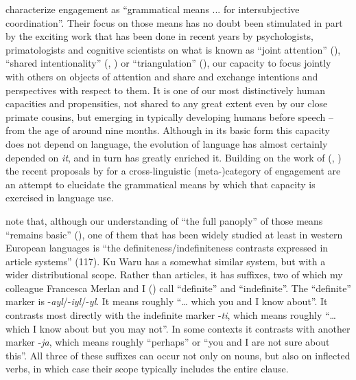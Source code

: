 \documentclass[output=paper]{langsci/langscibook}
\begin{document}
\citet[112]{Evansetal2018a} characterize engagement as “grammatical means ... for intersubjective coordination”. Their focus on those means has no doubt been stimulated in part by the exciting work that has been done in recent years by psychologists, primatologists and cognitive scientists on what is known as “joint attention” (\citealt{Elian2005}), “shared intentionality” (\citealt{Tomasello1999}, \citealt{Tomasello2005}) or “triangulation” (\citealt{Hobson2004}), our capacity to focus jointly with others on objects of attention and share and exchange intentions and perspectives with respect to them. It is one of our most distinctively human capacities and propensities, not shared to any great extent even by our close primate cousins, but emerging in typically developing humans before speech – from the age of around nine months. Although in its basic form this capacity does not depend on language, the evolution of language has almost certainly depended on \textit{it}, and in turn has greatly enriched it. Building on the work of \citeauthor{Landaburu2005} (\citeyear{Landaburu2005}, \citeyear{Landaburu2007}) the recent proposals by \citet{Evansetal2018b} for a cross-linguistic (meta-)category of engagement are an attempt to elucidate the grammatical means by which that capacity is exercised in language use. 

\citeauthor{Evansetal2018a} note that, although our understanding of “the full panoply” of those means “remains basic” (\citeyear[112]{Evansetal2018a}), one of them that has been widely studied at least in western European languages is “the definiteness/indefiniteness contrasts expressed in article systems” (117).
Ku Waru has a somewhat similar system, but with a wider distributional scope. Rather than articles, it has suffixes, two of which my colleague Francesca Merlan and I (\citealt[336--337]{MerlanRumsey1991}) call “definite” and “indefinite”.  The “definite” marker is   -\textit{ayl}/-\textit{iyl}/-\textit{yl}. It means roughly “… which you and I know about”. It contrasts most directly with the indefinite marker -\textit{ti}, which means roughly “… which I know about but you may not”. In some contexts it contrasts with another marker -\textit{ja}, which means roughly “perhaps” or “you and I are not sure about this”. All three of these suffixes can occur not only on nouns, but also on inflected verbs, in which case their scope typically includes the entire clause.
\end{document}
